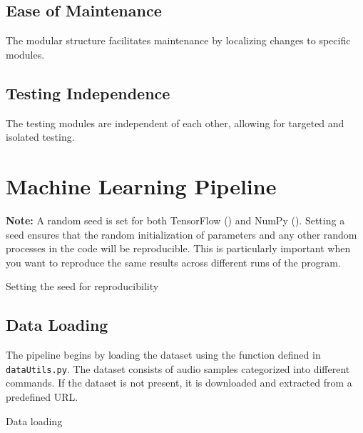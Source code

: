 \subsection{Ease of Maintenance}

The modular structure facilitates maintenance by localizing changes to specific modules.

\subsection{Testing Independence}

The testing modules are independent of each other, allowing for targeted and isolated testing.


\section{Machine Learning Pipeline}
\label{section:MLPipeline}

\textbf{Note:} A random seed is set for both TensorFlow () and NumPy (). Setting a seed ensures that the random initialization of parameters and any other random processes in the code will be reproducible. This is particularly important when you want to reproduce the same results across different runs of the program.

\begin{code}[h!]
	    
	
	\caption{Setting the seed for reproducibility}
	\label{code:seed}
\end{code}

\subsection{Data Loading}

The pipeline begins by loading the dataset using the  function defined in \texttt{dataUtils.py}. The dataset consists of audio samples categorized into different commands. If the dataset is not present, it is downloaded and extracted from a predefined URL.


\begin{code}[h!]
	    
	
	\caption{Data loading}
	\label{code:DataLoading}
\end{code}


